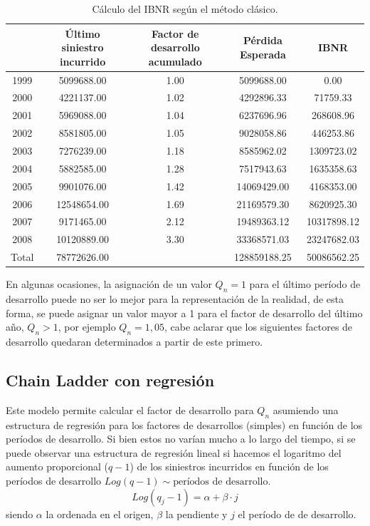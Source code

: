 \documentclass[
  12pt,
]{article}
\begin{document}
\begin{table}[ht]
\centering
\caption{Cálculo del IBNR según el método clásico.} 
\label{exhibit}
\begingroup\fontsize{10pt}{10pt}\selectfont
\begin{tabular}{ccccc}
  \hline
 & Último siniestro incurrido & Factor de desarrollo acumulado & Pérdida Esperada & IBNR \\ 
  \hline
1999 & 5099688.00 & 1.00 & 5099688.00 & 0.00 \\ 
  2000 & 4221137.00 & 1.02 & 4292896.33 & 71759.33 \\ 
  2001 & 5969088.00 & 1.04 & 6237696.96 & 268608.96 \\ 
  2002 & 8581805.00 & 1.05 & 9028058.86 & 446253.86 \\ 
  2003 & 7276239.00 & 1.18 & 8585962.02 & 1309723.02 \\ 
  2004 & 5882585.00 & 1.28 & 7517943.63 & 1635358.63 \\ 
  2005 & 9901076.00 & 1.42 & 14069429.00 & 4168353.00 \\ 
  2006 & 12548654.00 & 1.69 & 21169579.30 & 8620925.30 \\ 
  2007 & 9171465.00 & 2.12 & 19489363.12 & 10317898.12 \\ 
  2008 & 10120889.00 & 3.30 & 33368571.03 & 23247682.03 \\ 
  Total & 78772626.00 &  & 128859188.25 & 50086562.25 \\ 
   \hline
\end{tabular}
\endgroup
\end{table}

En algunas ocasiones, la asignación de un valor \(Q_n=1\) para el último
período de desarrollo puede no ser lo mejor para la representación de la
realidad, de esta forma, se puede asignar un valor mayor a 1 para el
factor de desarrollo del último año, \(Q_n>1\), por ejemplo
\(Q_n=1,05\), cabe aclarar que los siguientes factores de desarrollo
quedaran determinados a partir de este primero.

\subsection{Chain Ladder con
regresión}\label{chain-ladder-con-regresiuxf3n}

Este modelo permite calcular el factor de desarrollo para \(Q_n\)
asumiendo una estructura de regresión para los factores de desarrollos
(simples) en función de los períodos de desarrollo. Si bien estos no
varían mucho a lo largo del tiempo, si se puede observar una estructura
de regresión lineal si hacemos el logaritmo del aumento proporcional
(\(q-1\)) de los siniestros incurridos en función de los períodos de
desarrollo \(Log(q-1) \sim \text{períodos de desarrollo}\). \[
Log(q_j -1) = \alpha + \beta\cdot j
\] siendo \(\alpha\) la ordenada en el origen, \(\beta\) la pendiente y
\(j\) el período de de desarrollo.
\end{document}
